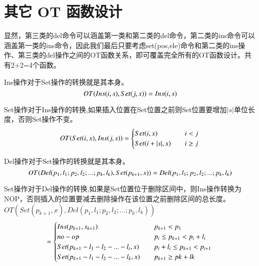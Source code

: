 \section{其它 OT 函数设计}
\par 显然，第三类的del命令可以涵盖第一类和第二类的del命令，第二类的ins命令可以涵盖第一类的ins命令，因此我们最后只要考虑set(pos,ele)命令和第二类的ins操作、第三类的del操作之间的OT函数关系，即可覆盖完全所有的OT函数设计。共有2+2=4个函数。

\par Ins操作对于Set操作的转换就是其本身。
\begin{equation}
OT(Ins(i,s),Set(j,x))= Ins(i,s)\\
\end{equation}

\par Set操作对于Ins操作的转换,如果插入位置在Set位置之前则Set位置要增加$|s|$单位长度，否则Set操作不变。
\begin{equation}
OT(Set(i,x),Ins(j,s))= \begin{cases}
{Set(i,x)}  \quad & i<j \\
{Set(i+|s|,x)} \quad  &i \ge j \end{cases} \\
\end{equation}

\par Del操作对于Set操作的转换就是其本身。
\begin{equation}
OT(Del(p_1,l_1;p_2,l_2;...;p_k,l_k),Set(p_{k+1},x)) = Del(p_1,l_1;p_2,l_2;...;p_k,l_k)\\
\end{equation}

\par Set操作对于Del操作的转换,如果是Set位置位于删除区间中，则Ins操作转换为NOP，否则插入的位置要减去删除操作在该位置之前删除区间的总长度。
$OT(Set(p_{k+1},x),Del(p_1,l_1;p_2,l_2;...;p_k,l_k))$
\begin{equation}
= \begin{cases}
Ins(p_{k+1},s_{k+1}) \quad & p_{k+1} < p_1 \\
no-op \quad & p_i \le p_{k+1} < p_i+l_i\\
Set(p_{k+1}-l_1-l_2-...-l_i,x) \quad & p_i+l_i \le p_{k+1} < p_{i+1}\\
Set(p_{k+1}-l_1-l_2-...-l_k,x) \quad & p_{k+1} \ge pk+lk \end{cases}\\
\end{equation}